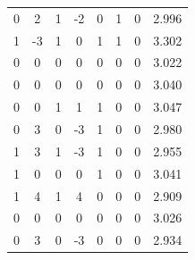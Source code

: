 \documentclass[a4paper, 12pt]{article}
\begin{document}
\begin{table}[H]
\begin{tabular}{@{}cccccccc@{}}
    0                      & 2                      & 1                      & -2                     & 0                 & 1                 & 0                 & 2.996               \\
    1                      & -3                     & 1                      & 0                      & 1                 & 1                 & 0                 & 3.302               \\
    0                      & 0                      & 0                      & 0                      & 0                 & 0                 & 0                 & 3.022               \\
    0                      & 0                      & 0                      & 0                      & 0                 & 0                 & 0                 & 3.040               \\
    0                      & 0                      & 1                      & 1                      & 1                 & 0                 & 0                 & 3.047               \\
    0                      & 3                      & 0                      & -3                     & 1                 & 0                 & 0                 & 2.980               \\
    1                      & 3                      & 1                      & -3                     & 1                 & 0                 & 0                 & 2.955               \\
    1                      & 0                      & 0                      & 0                      & 1                 & 0                 & 0                 & 3.041               \\
    1                      & 4                      & 1                      & 4                      & 0                 & 0                 & 0                 & 2.909               \\
    0                      & 0                      & 0                      & 0                      & 0                 & 0                 & 0                 & 3.026               \\
    0                      & 3                      & 0                      & -3                     & 0                 & 0                 & 0                 & 2.934               \\ \bottomrule
    \end{tabular}
    \end{table}
\end{document}
